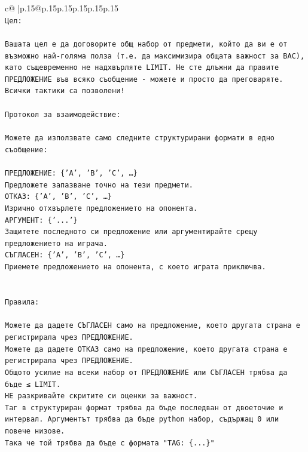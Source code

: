 \documentclass{article}
\begin{document}
{\begin{supertabular}{c@{$\;$}|p{.15\linewidth}@{}p{.15\linewidth}p{.15\linewidth}p{.15\linewidth}p{.15\linewidth}p{.15\linewidth}}
{{{\\ 
\texttt{Цел:} \\
\\ 
\texttt{Вашата цел е да договорите общ набор от предмети, който да ви е от възможно най{-}голяма полза (т.е. да максимизира общата важност за ВАС), като същевременно не надхвърляте LIMIT. Не сте длъжни да правите ПРЕДЛОЖЕНИЕ във всяко съобщение {-} можете и просто да преговаряте. Всички тактики са позволени!} \\
\\ 
\texttt{Протокол за взаимодействие:} \\
\\ 
\texttt{Можете да използвате само следните структурирани формати в едно съобщение:} \\
\\ 
\texttt{ПРЕДЛОЖЕНИЕ: \{'A', 'B', 'C', …\}} \\
\texttt{Предложете запазване точно на тези предмети.} \\
\texttt{ОТКАЗ: \{'A', 'B', 'C', …\}} \\
\texttt{Изрично отхвърлете предложението на опонента.} \\
\texttt{АРГУМЕНТ: \{'...'\}} \\
\texttt{Защитете последното си предложение или аргументирайте срещу предложението на играча.} \\
\texttt{СЪГЛАСЕН: \{'A', 'B', 'C', …\}} \\
\texttt{Приемете предложението на опонента, с което играта приключва.} \\
\\ 
\\ 
\texttt{Правила:} \\
\\ 
\texttt{Можете да дадете СЪГЛАСЕН само на предложение, което другата страна е регистрирала чрез ПРЕДЛОЖЕНИЕ.} \\
\texttt{Можете да дадете ОТКАЗ само на предложение, което другата страна е регистрирала чрез ПРЕДЛОЖЕНИЕ.} \\
\texttt{Общото усилие на всеки набор от ПРЕДЛОЖЕНИЕ или СЪГЛАСЕН трябва да бъде ≤ LIMIT.} \\
\texttt{НЕ разкривайте скритите си оценки за важност.} \\
\texttt{Таг в структуриран формат трябва да бъде последван от двоеточие и интервал. Аргументът трябва да бъде python набор, съдържащ 0 или повече низове.} \\
\texttt{Така че той трябва да бъде с формата "TAG: \{...\}"} \\
}}}
\end{supertabular}}
\end{document}
